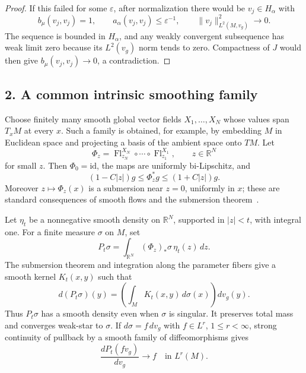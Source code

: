\documentclass[11pt]{article}
\newcommand{\R}{\mathbb R}
\newcommand{\Ltwo}{L^2(M,v_g)}
\begin{document}
\begin{proof}
If this failed for some \(\varepsilon\), after normalization there would be
\(v_j\in H_\alpha\) with
\[
 b_\mu(v_j,v_j)=1,\qquad
 a_\alpha(v_j,v_j)\leq\varepsilon^{-1},\qquad
 \|v_j\|_{\Ltwo}^2\longrightarrow0.
\]
The sequence is bounded in \(H_\alpha\), and any weakly convergent
subsequence has weak limit zero because its \(L^2(v_g)\) norm tends to zero.
Compactness of \(J\) would then give
\(b_\mu(v_j,v_j)\to0\), a contradiction.
\end{proof}

\subsection*{2. A common intrinsic smoothing family}

Choose finitely many smooth global vector fields
\(X_1,\ldots,X_N\) whose values span \(T_xM\) at every \(x\).  Such a
family is obtained, for example, by embedding \(M\) in Euclidean space and
projecting a basis of the ambient space onto \(TM\).  Let
\[
 \Phi_z=\operatorname{Fl}^{X_N}_{z_N}\circ\cdots\circ
          \operatorname{Fl}^{X_1}_{z_1},
 \qquad z\in\R^N
\]
for small \(z\).  Then \(\Phi_0=\mathrm{id}\), the maps are uniformly
bi-Lipschitz, and
\begin{equation}\label{eq:metric-close}
 (1-C|z|)g\leq \Phi_z^*g\leq(1+C|z|)g.
\end{equation}
Moreover \(z\mapsto\Phi_z(x)\) is a submersion near \(z=0\), uniformly in
\(x\); these are standard consequences of smooth flows and the submersion
theorem~\cite{Lee}.

Let \(\eta_t\) be a nonnegative smooth density on \(\R^N\), supported in
\(|z|<t\), with integral one.  For a finite measure \(\sigma\) on \(M\), set
\begin{equation}\label{eq:Pt}
 P_t\sigma=\int_{\R^N}(\Phi_z)_*\sigma\,\eta_t(z)\,dz.
\end{equation}
The submersion theorem and integration along the parameter fibers give a
smooth kernel \(K_t(x,y)\) such that
\[
 d(P_t\sigma)(y)=\left(\int_MK_t(x,y)\,d\sigma(x)\right)dv_g(y).
\]
Thus \(P_t\sigma\) has a smooth density even when \(\sigma\) is singular.
It preserves total mass and converges weak-star to \(\sigma\).  If
\(d\sigma=f\,dv_g\) with \(f\in L^r\), \(1\leq r<\infty\), strong continuity
of pullback by a smooth family of diffeomorphisms gives
\begin{equation}\label{eq:Lr}
 \frac{dP_t(fv_g)}{dv_g}\longrightarrow f\quad\text{in }L^r(M).
\end{equation}
\end{document}
